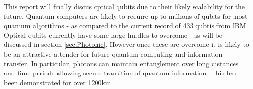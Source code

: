 This report will finally discus optical qubits due to their likely scalability for the future. 
Quantum computers are likely to require up to millions of qubits for most quantum algorithms - as compared to the current record of 433 qubtis from IBM. \cite{bergou_quantum_2021} 
Optical qubits currently have some large hurdles to overcome - as will be discussed in section \ref{sec:Photonic}. However once these are overcome it is likely to be an attractive attender for future quantum computing and information transfer.
In particular, photons can maintain entanglement over long distances and time periods allowing secure transition of quantum information - this has been demonstrated for over 1200km. \cite{yin_satellite-based_2017}